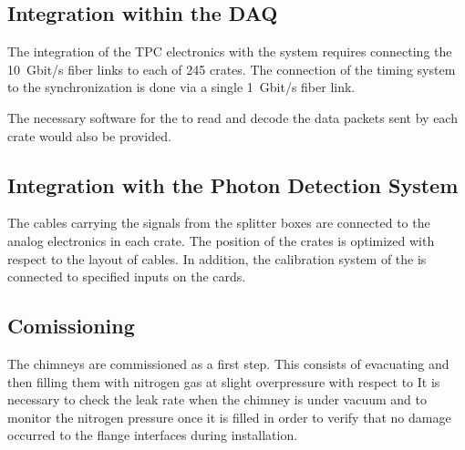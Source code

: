 \subsection{Integration within the DAQ}
\label{sec:fddp-tpc-elec-install-daq}
The integration of the \dual TPC electronics with the  system requires connecting the \SI{10}{Gbit/s} fiber links to each of \num{245}  crates. The connection of the timing system to the synchronization  is done via a single \SI{1}{Gbit/s} fiber link. 

The necessary software for the  to read and decode the data packets sent by each  crate would also be provided.   

\subsection{Integration with the Photon Detection System}
\label{sec:fddp-tpc-elec-install-pmt}
The cables carrying the  signals from the splitter boxes %
are connected to the  analog electronics in each  crate. The position of the crates %
is optimized with respect to the layout of  cables. In addition, the calibration system of the  %
is connected to specified inputs on the cards.



\subsection{Comissioning}
\label{sec:fddp-tpc-elec-comission}

The  chimneys are commissioned as a first step. This consists of evacuating and then filling them with nitrogen gas at slight overpressure with respect to %
It is necessary to check the leak rate when the chimney is under vacuum and to monitor the nitrogen pressure once it is filled in order to verify that no damage occurred to the flange interfaces during installation.

